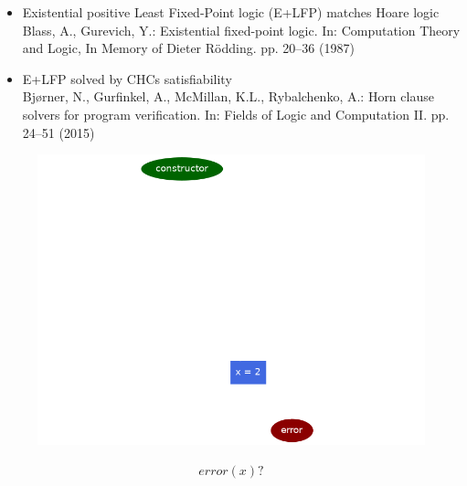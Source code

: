 \documentclass[aspectratio=169,10pt]{beamer}
\begin{document}
\begin{frame}
\begin{itemize}
	\item Existential positive Least Fixed-Point logic (E+LFP) matches Hoare logic\\Blass, A., Gurevich, Y.: Existential fixed-point logic. In: Computation Theory and Logic, In Memory of Dieter Rödding. pp. 20–36 (1987)
	\item E+LFP solved by CHCs satisfiability\\Bjørner, N., Gurfinkel, A., McMillan, K.L., Rybalchenko, A.: Horn clause solvers for program verification. In: Fields of Logic and Computation II. pp. 24–51 (2015)
\end{itemize}
\end{frame}

\begin{frame}[fragile]
\begin{figure}
\noindent\begin{minipage}{.49\textwidth}
	\includegraphics[scale=0.3]{images/state_machine_counterexample}
\end{minipage}
\noindent\begin{minipage}{.49\textwidth}
{\small
\begin{align*}
	error(x) ?
\end{align*}
}%
\end{minipage}
\end{figure}
\end{frame}
\end{document}

